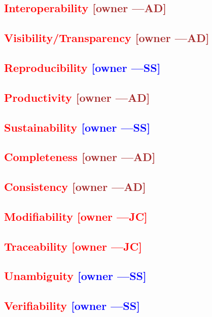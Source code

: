 \documentclass[letterpaper,cleveref]{lipics-v2019}
\newcommand{\authornote}[3]{\textcolor{#1}{[#3 ---#2]}}
\newcommand{\authornote}[3]{}
\newcommand{\wss}[1]{\authornote{blue}{SS}{#1}} %
\newcommand{\jc}[1]{\authornote{red}{JC}{#1}} %
\newcommand{\ad}[1]{\authornote{brown}{AD}{#1}} %
\newcommand{\notdone}[1]{\textcolor{red}{#1}}
\theoremstyle{definition}
\begin{document}
\subsection{\notdone{Interoperability} \ad{owner}}

\subsection{\notdone{Visibility/Transparency} \ad{owner}}

\subsection{\notdone{Reproducibility} \wss{owner}}

\subsection{\notdone{Productivity} \ad{owner}}

\subsection{\notdone{Sustainability} \wss{owner}}

\subsection{\notdone{Completeness} \ad{owner}}

\subsection{\notdone{Consistency} \ad{owner}}

\subsection{\notdone{Modifiability} \jc{owner}}

\subsection{\notdone{Traceability} \jc{owner}}

\subsection{\notdone{Unambiguity} \wss{owner}}

\subsection{\notdone{Verifiability} \wss{owner}}
\end{document}
